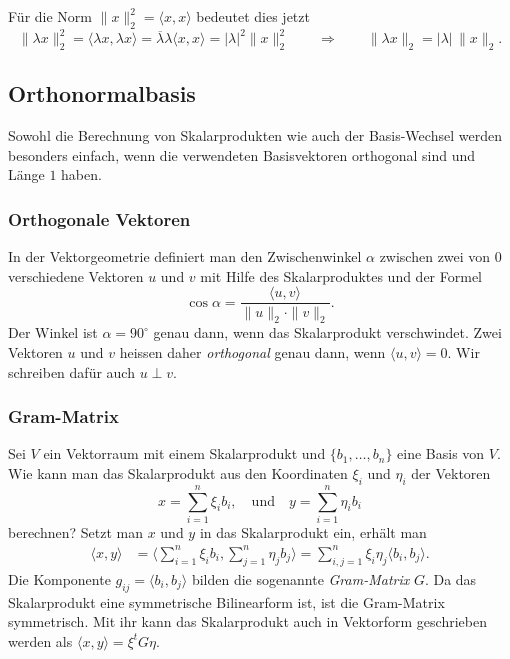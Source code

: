 Für die Norm $\|x\|_2^2=\langle x,x\rangle$ bedeutet dies jetzt
\[
\|\lambda x\|_2^2
=
\langle \lambda x,\lambda x\rangle
=
\overline{\lambda}\lambda \langle x,x\rangle
=
|\lambda|^2 \|x\|_2^2
\qquad\Rightarrow\qquad
\|\lambda x\|_2 = |\lambda|\, \|x\|_2.
\]

\subsection{Orthonormalbasis
\label{buch:subsection:orthonormalbasis}}
%
Sowohl die Berechnung von Skalarprodukten wie auch der Basis-Wechsel
werden besonders einfach, wenn die verwendeten Basisvektoren orthogonal
sind und Länge $1$ haben.

\subsubsection{Orthogonale Vektoren}
In der Vektorgeometrie definiert man den Zwischenwinkel $\alpha$
zwischen zwei von $0$ verschiedene Vektoren $u$ und $v$ mit Hilfe
des Skalarproduktes und der Formel
\[
\cos\alpha = \frac{\langle u,v\rangle}{\|u\|_2\cdot\|v\|_2}.
\]
Der Winkel ist $\alpha=90^\circ$ genau dann, wenn das Skalarprodukt
verschwindet.
Zwei Vektoren $u$ und $v$ heissen daher {\em orthogonal} genau dann,
wenn $\langle u,v\rangle=0$.
Wir schreiben dafür auch $u\perp v$.
%

\subsubsection{Gram-Matrix}
Sei $V$ ein Vektorraum mit einem Skalarprodukt und $\{b_1,\dots,b_n\}$ eine
Basis von $V$.
Wie kann man das Skalarprodukt aus den Koordinaten $\xi_i$ und $\eta_i$
der Vektoren 
\[
x = \sum_{i=1}^n \xi_i b_i,
\quad\text{und}\quad
y = \sum_{i=1}^n \eta_i b_i
\]
berechnen?
Setzt man $x$ und $y$ in das Skalarprodukt ein, erhält man
\begin{align}
\langle x,y\rangle
&=
\biggl\langle
\sum_{i=1}^n \xi_i b_i,
\sum_{j=1}^n \eta_j b_j
\biggr\rangle
=
\sum_{i,j=1}^n \xi_i\eta_j \langle b_i,b_j\rangle.
\label{buch:skalarprodukt:eqn:skalarproduktgram}
\end{align}
Die Komponente $g_{i\!j}=\langle b_i,b_j\rangle$ bilden die sogenannte
{\em Gram-Matrix} $G$.
%
Da das Skalarprodukt eine symmetrische Bilinearform ist, ist die
Gram-Matrix symmetrisch.
Mit ihr kann das Skalarprodukt auch in Vektorform geschrieben werden
als $\langle x,y\rangle = \xi^t G\eta$.

